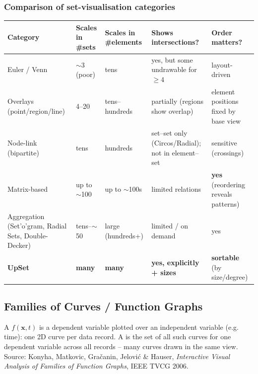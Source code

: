 \subsubsection{Comparison of set-visualisation categories}

\begin{center}
\begin{tabular}{@{}p{2.6cm}p{1.9cm}p{2.1cm}p{2.4cm}p{3.0cm}@{}}
\toprule
\textbf{Category} & \textbf{Scales in \#sets} & \textbf{Scales in \#elements}
  & \textbf{Shows intersections?} & \textbf{Order matters?}\\
\midrule
Euler / Venn & $\sim$3 (poor) & tens & yes, but some undrawable for $\ge 4$
  & layout-driven\\
Overlays (point/region/line) & 4--20 & tens--hundreds & partially (regions
  show overlap) & element positions fixed by base view\\
Node-link (bipartite) & tens & hundreds & set--set only (Circos/Radial); not in
  element--set & sensitive (crossings)\\
Matrix-based & up to $\sim$100 & up to $\sim$100s & limited relations
  & \textbf{yes} (reordering reveals patterns)\\
Aggregation (Set'o'gram, Radial Sets, Double-Decker) & tens--$\sim$50 & large
  (hundreds+) & limited / on demand & yes\\
\textbf{UpSet} & \textbf{many} & \textbf{many} & \textbf{yes, explicitly +
  sizes} & \textbf{sortable} (by size/degree)\\
\bottomrule
\end{tabular}
\end{center}

\subsection{Families of Curves / Function Graphs}

\begin{keybox}[Definition]
A  $f(\mathbf{x},t)$ is a dependent variable plotted over
an independent variable (e.g. time): one 2D curve per data record. A
 is the set of all such curves for one
dependent variable across all records -- many curves drawn in the same view.
Source: Konyha, Matkovic, Gra\v{c}anin, Jelovi\'c \& Hauser, \emph{Interactive
Visual Analysis of Families of Function Graphs}, IEEE TVCG 2006.
\end{keybox}


